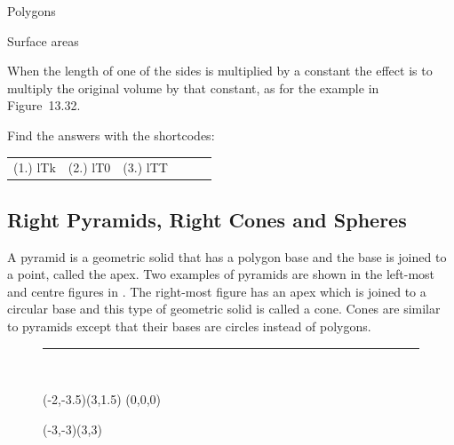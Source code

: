 \begin{exercises}{Polygons}
\begin{exercises}{Surface areas }
{\begin{mdframed}[linewidth=4, leftmargin=40, rightmargin=40]
\begin{exercise}
    \end{exercise}
    \end{mdframed}
    }
    \noindent
  
        \label{m39357*id64533}When the length of one of the sides is multiplied by a constant the effect is to multiply the original volume by that constant, as for the example in Figure~13.32.\par 
      
    

  \label{m39357*cid323}
\par {} Find the answers with the shortcodes:
 \par \begin{tabular}[h]{cccccc}
 (1.) lTk  &  (2.) lT0  &  (3.) lTT  & \end{tabular}



\subsection{ Right Pyramids, Right Cones and Spheres}
      
A pyramid is a geometric solid that has a polygon base and the base is joined to a point, called the apex. Two examples of pyramids are shown in the left-most and centre figures in . The right-most figure has an apex which is joined to a circular base and this type of geometric solid is called a cone. Cones are similar to pyramids except that their bases are circles instead of polygons.\par 
      
\begin{figure}[H]
    \begin{center}
	\rule[.1in]{\figurerulewidth}{.005in} \\
	
	\begin{pspicture}(-2,-3.5)(3,1.5)
	    \psSolid[object=face,fillcolor=cyan,opacity=0.5,base=-0.0 -0.5 1 -0.5 0 0.5](0,0,0)
	    \psSolid[object=tetrahedron,action=draw,r=1,linecolor=blue,action=draw]

	    
	\end{pspicture}

	\begin{pspicture}(-3,-3)(3,3)
	    \psSolid[object=sphere,fillstyle=hue,fillcolor=cyan,ngrid=50 50,RotX=180,RotZ=30,grid=false]
	\end{pspicture}


\end{center}
\end{figure}
\end{exercises}
\end{exercises}
